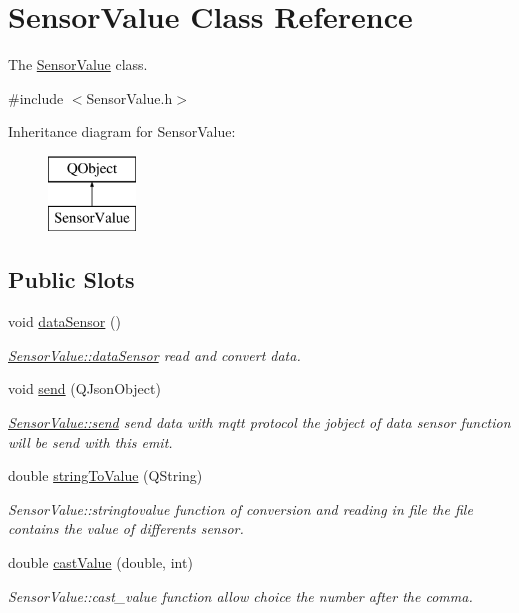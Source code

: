 \hypertarget{classSensorValue}{}\section{Sensor\+Value Class Reference}
\label{classSensorValue}


The \hyperlink{classSensorValue}{Sensor\+Value} class.  




{\ttfamily \#include $<$Sensor\+Value.\+h$>$}

Inheritance diagram for Sensor\+Value\+:\begin{figure}[H]
\begin{center}
\leavevmode
\includegraphics[height=2.000000cm]{classSensorValue}
\end{center}
\end{figure}
\subsection*{Public Slots}
\begin{DoxyCompactItemize}
\item 
void \hyperlink{classSensorValue_af24ff9ad2ade8fe703c4d67ae91fe3b5}{data\+Sensor} ()
\begin{DoxyCompactList}\small\item\em \hyperlink{classSensorValue_af24ff9ad2ade8fe703c4d67ae91fe3b5}{Sensor\+Value\+::data\+Sensor} read and convert data. \end{DoxyCompactList}\item 
void \hyperlink{classSensorValue_afa482d6ee6d1da567aad5c31f0118403}{send} (Q\+Json\+Object)
\begin{DoxyCompactList}\small\item\em \hyperlink{classSensorValue_afa482d6ee6d1da567aad5c31f0118403}{Sensor\+Value\+::send} send data with mqtt protocol the jobject of data sensor function will be send with this emit. \end{DoxyCompactList}\item 
double \hyperlink{classSensorValue_acf9b28e185a3f5c8c43bc409eb6d6723}{string\+To\+Value} (Q\+String)
\begin{DoxyCompactList}\small\item\em Sensor\+Value\+::stringtovalue function of conversion and reading in file the file contains the value of differents sensor. \end{DoxyCompactList}\item 
double \hyperlink{classSensorValue_a15d579b0938d2a8933f88563b108d150}{cast\+Value} (double, int)
\begin{DoxyCompactList}\small\item\em Sensor\+Value\+::cast\+\_\+value function allow choice the number after the comma. \end{DoxyCompactList}\end{DoxyCompactItemize}
